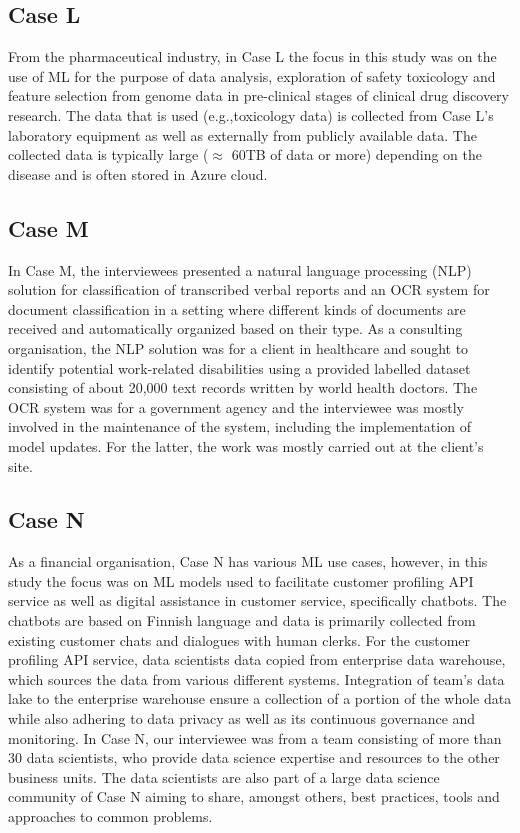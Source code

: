 \subsection{Case L}
From the pharmaceutical industry, in Case L the focus in this study was on the use of ML for the purpose of data analysis, exploration of safety toxicology and feature selection from genome data in pre-clinical stages of clinical drug discovery research. The data that is used (e.g.,toxicology data) is collected from Case L's laboratory equipment as well as externally from publicly available data. The collected data is typically large ($\approx$ 60TB of data or more) depending on the disease and is often stored in Azure cloud. 


\subsection{Case M}
In Case M, the interviewees presented a natural language processing (NLP) solution for classification of transcribed verbal reports and an OCR system for document classification in a setting where different kinds of documents are received and automatically organized based on their type. As a consulting organisation, the NLP solution was for a client in healthcare and sought to identify potential work-related disabilities using a provided labelled dataset consisting of about 20,000 text records written by world health doctors. The OCR system was for a government agency and the interviewee was mostly involved in the maintenance of the system, including the implementation of model updates. For the latter, the work was mostly carried out at the client's site.


\subsection{Case N}
As a financial organisation, Case N has various ML use cases, however, in this study the focus was on ML models used to facilitate customer profiling API service as well as digital assistance in customer service, specifically chatbots. The chatbots are based on Finnish language and data is primarily collected from existing customer chats and dialogues with human clerks. For the customer profiling API service, data scientists data copied from enterprise data warehouse, which sources the data from various different systems. Integration of team's data lake to the enterprise warehouse ensure a collection of a portion of the whole data while also adhering to data privacy as well as its continuous governance and monitoring. In Case N, our interviewee was from a team consisting of more than 30 data scientists, who provide data science expertise and resources to the other business units. The data scientists are also part of a large data science community of Case N aiming to share, amongst others, best practices, tools and approaches to common problems.


